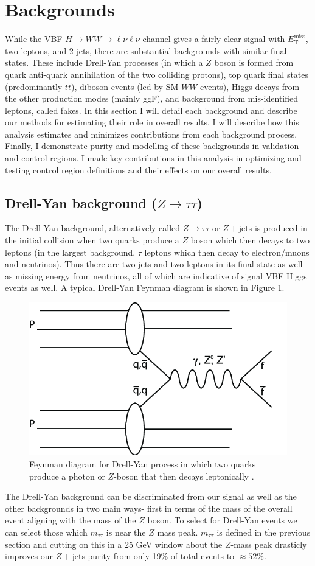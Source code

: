 \section{Backgrounds}
While the VBF $H\rightarrow WW\rightarrow \ell\nu\ell\nu$ channel gives a fairly clear signal with $E_{\text{T}}^{\text{miss}}$, two leptons, and 2 jets, there are substantial backgrounds with similar final states. These include Drell-Yan processes (in which a $Z$ boson is formed from quark anti-quark annihilation of the two colliding protons), top quark final states (predominantly $t\bar{t}$), diboson events (led by SM $WW$ events), Higgs decays from the other production modes (mainly ggF), and background from mis-identified leptons, called fakes. In this section I will detail each background and describe our methods for estimating their role in overall results. I will describe how this analysis estimates and minimizes contributions from each background process. Finally, I demonstrate purity and modelling of these backgrounds in validation and control regions. I made key contributions in this analysis in optimizing and testing control region definitions and their effects on our overall results. 

\subsection{Drell-Yan background ($Z\rightarrow \tau\tau$)}
The Drell-Yan background, alternatively called $Z\rightarrow \tau\tau$ or $Z+$jets is produced in the initial collision when two quarks produce a $Z$ boson which then decays to two leptons (in the largest background, $\tau$ leptons which then decay to electron/muons and neutrinos).  Thus there are two jets and two leptons in its final state as well as missing energy from neutrinos, all of which are indicative of signal VBF Higgs events as well. A typical Drell-Yan Feynman diagram is shown in Figure \ref{fig:DrellYan}. 
\begin{figure}
\centering
  \includegraphics[width=.35\linewidth]{Pictures/FeynmanDrellYan.png}
\caption{Feynman diagram for Drell-Yan process in which two quarks produce a photon or $Z$-boson that then decays leptonically \cite{DrellYan}.}
\label{fig:DrellYan}
\end{figure}
The Drell-Yan background can be discriminated from our signal as well as the other backgrounds in two main ways- first in terms of the mass of the overall event aligning with the mass of the $Z$ boson. To select for Drell-Yan events we can select those which $m_{\tau\tau}$ is near the $Z$ mass peak. $m_{\tau\tau}$ is defined in the previous section and cutting on this in a 25 GeV window about the $Z$-mass peak drasticly improves our $Z+$jets purity from only 19$\%$ of total events to $\approx52\%$. 

